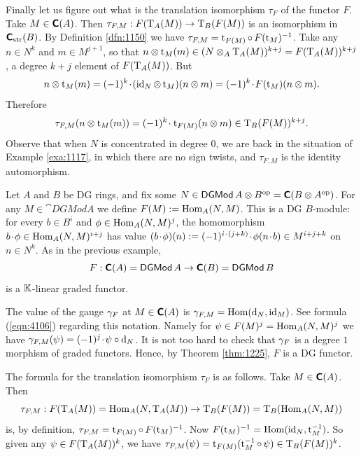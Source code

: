 \begin{exa}
Finally let us figure out what is the translation isomorphism $\tau_F$ of the 
functor $F$. Take $M \in \boldsymbol{\mathsf{C}}(A)$. 
Then 
$\tau_{F, M} : F(\operatorname{T}_{A}(M)) \to \operatorname{T}_{B}(F(M))$
is an isomorphism in $\boldsymbol{\mathsf{C}}_{\mathrm{str}}(B)$. 
By Definition \ref{dfn:1150} we have 
$\tau_{F, M} = \operatorname{t}_{F(M)} \circ \, F(\operatorname{t}_M)^{-1}$.
Take any $n \in N^k$ and $m \in M^{j + 1}$, so that 
$n \otimes \operatorname{t}_M(m) \in (N \otimes_A \operatorname{T}_{A}(M))^{k + j} 
= F(\operatorname{T}_{A}(M))^{k + j}$,
a degree $k + j$ element of $F(\operatorname{T}_{A}(M))$. But 
\[ n \otimes \operatorname{t}_M(m) = (-1)^k \mspace{1.5mu}{\cdot}\mspace{1.5mu} (\operatorname{id}_N \otimes \operatorname{t}_M)(n \otimes m) = 
(-1)^k \mspace{1.5mu}{\cdot}\mspace{1.5mu} F(\operatorname{t}_M)(n \otimes m) . \]
Therefore 
\[ \tau_{F, M}(n \otimes \operatorname{t}_M(m)) = 
(-1)^k \mspace{1.5mu}{\cdot}\mspace{1.5mu} \operatorname{t}_{F(M)}(n \otimes m) \in \operatorname{T}_{B}(F(M))^{k + j} .  \]
Observe that when $N$ is concentrated in degree $0$, we are back in the 
situation of Example \ref{exa:1117}, in which there are no sign twists, and 
$\tau_{F, M}$ is the identity automorphism. 
\end{exa}

\begin{exa} \label{exa:1120}
Let $A$ and $B$  be DG rings, and fix some 
$N \in \operatorname{\mathsf{DGMod}} A \otimes B^{\mathrm{op}} = \boldsymbol{\mathsf{C}}(B \otimes A^{\mathrm{op}})$.
For any $M \in \cat{DGMod} A$ we define 
$F(M) := \operatorname{Hom}_A(N, M)$.
This is a DG $B$-module: for every $b \in B^i$ and
$\phi \in \operatorname{Hom}_A(N, M)^j$, the homomorphism 
$b \mspace{1.5mu}{\cdot}\mspace{1.5mu} \phi \in \operatorname{Hom}_A(N, M)^{i + j}$ has value
$(b \mspace{1.5mu}{\cdot}\mspace{1.5mu} \phi)(n) := (-1)^{i \mspace{1.5mu}{\cdot}\mspace{1.5mu} (j + k)} \mspace{1.5mu}{\cdot}\mspace{1.5mu} \phi(n \mspace{1.5mu}{\cdot}\mspace{1.5mu} b) \in M^{i + j + k}$
on $n \in N^k$. As in the previous example, 
\[ F : \boldsymbol{\mathsf{C}}(A) = \operatorname{\mathsf{DGMod}} A \to \boldsymbol{\mathsf{C}}(B) = \operatorname{\mathsf{DGMod}} B \]
is a $\mathbb{K}$-linear graded functor. 

The value of the gauge $\gamma_F$ at $M \in \boldsymbol{\mathsf{C}}(A)$  is 
$\gamma_{F, M} = \operatorname{Hom}(\mathrm{d}_N, \operatorname{id}_M)$.
See formula (\ref{eqn:4106})  
regarding this notation. Namely for 
$\psi \in F(M)^j = \operatorname{Hom}_A(N, M)^j$
we have 
$\gamma_{F, M}(\psi) = (-1)^{ j} \mspace{1.5mu}{\cdot}\mspace{1.5mu} \psi \circ \mathrm{d}_N$.
It is not too hard to check that $\gamma_F$ is a degree $1$ morphism of graded 
functors. Hence, by Theorem \ref{thm:1225}, $F$ is a DG functor. 

The formula for the translation isomorphism $\tau_F$ is as follows. 
Take $M \in \boldsymbol{\mathsf{C}}(A)$. Then 
\[ \tau_{F, M} : F(\operatorname{T}_{A}(M)) = \operatorname{Hom}_A(N, \operatorname{T}_{A}(M))
\to \operatorname{T}_{B}(F(M)) = \operatorname{T}_{B}(\operatorname{Hom}_A(N, M)) \]
is, by definition, 
$\tau_{F, M} = \operatorname{t}_{F(M)} \circ \, F(\operatorname{t}_{M})^{-1}$.
Now
$F(\operatorname{t}_{M})^{-1} = \operatorname{Hom}(\operatorname{id}_N, \operatorname{t}_{M}^{-1})$.
So given any 
$\psi \in F(\operatorname{T}_{A}(M))^k$, we have 
$\tau_{F, M}(\psi) = \operatorname{t}_{F(M)}(\operatorname{t}_{M}^{-1} \circ \, \psi) \in 
\operatorname{T}_{B}(F(M))^k$.
\end{exa}

